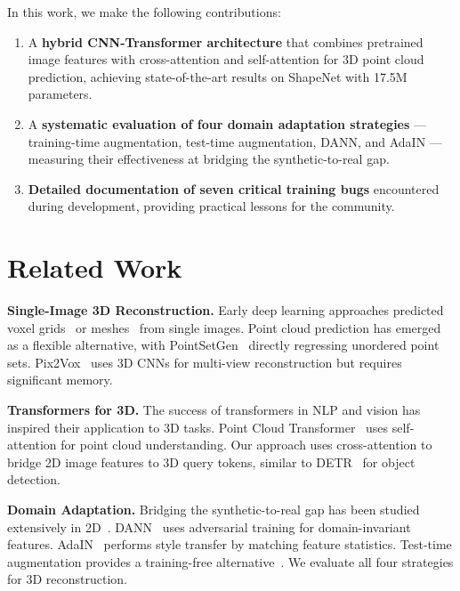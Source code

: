 \documentclass[10pt,twocolumn,letterpaper]{article}
\begin{document}
In this work, we make the following contributions:
\begin{enumerate}
\item A \textbf{hybrid CNN-Transformer architecture} that combines pretrained image features with cross-attention and self-attention for 3D point cloud prediction, achieving state-of-the-art results on ShapeNet with 17.5M parameters.
\item A \textbf{systematic evaluation of four domain adaptation strategies} --- training-time augmentation, test-time augmentation, DANN, and AdaIN --- measuring their effectiveness at bridging the synthetic-to-real gap.
\item \textbf{Detailed documentation of seven critical training bugs} encountered during development, providing practical lessons for the community.
\end{enumerate}

\section{Related Work}

\textbf{Single-Image 3D Reconstruction.}
Early deep learning approaches predicted voxel grids~\cite{choy20163d} or meshes~\cite{wang2018pixel2mesh} from single images.
Point cloud prediction has emerged as a flexible alternative, with PointSetGen~\cite{fan2017point} directly regressing unordered point sets.
Pix2Vox~\cite{xie2019pix2vox} uses 3D CNNs for multi-view reconstruction but requires significant memory.

\textbf{Transformers for 3D.}
The success of transformers in NLP and vision has inspired their application to 3D tasks.
Point Cloud Transformer~\cite{guo2021pct} uses self-attention for point cloud understanding.
Our approach uses cross-attention to bridge 2D image features to 3D query tokens, similar to DETR~\cite{carion2020end} for object detection.

\textbf{Domain Adaptation.}
Bridging the synthetic-to-real gap has been studied extensively in 2D~\cite{ganin2016domain, huang2017arbitrary}.
DANN~\cite{ganin2016domain} uses adversarial training for domain-invariant features.
AdaIN~\cite{huang2017arbitrary} performs style transfer by matching feature statistics.
Test-time augmentation provides a training-free alternative~\cite{shanmugam2021better}.
We evaluate all four strategies for 3D reconstruction.

\end{document}
